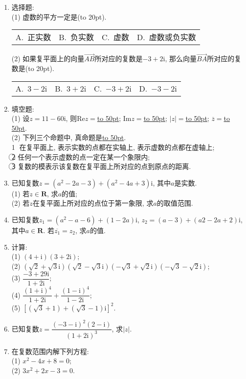 \documentclass[10pt,a4paper]{article}
\newcommand{\blank}[1]{\underline{\hbox to #1pt{}}}
\newcommand{\bracket}[1]{(\hbox to #1pt{})}
\newcommand{\fourch}[4]{\par\begin{tabular}{p{.23\textwidth}p{.23\textwidth}p{.23\textwidth}p{.23\textwidth}}
A.~#1 &B.~#2& C.~#3& D.~#4
\end{tabular}}
\begin{document}
\begin{enumerate}[1.]

\item 选择题:\\
(1) 虚数的平方一定是\bracket{20}.
\fourch{正实数}{负实数}{虚数}{虚数或负实数}
(2) 如果复平面上的向量$\overrightarrow{AB}$所对应的复数是$-3+2\mathrm{i}$, 那么向量$\overrightarrow{BA}$所对应的复数是\bracket{20}.
\fourch{$3-2\mathrm{i}$}{$3+2\mathrm{i}$}{$-3+2\mathrm{i}$}{$-3-2\mathrm{i}$}
\vspace*{3cm}
\item 填空题:\\
(1) 设$z=11-60\mathrm{i}$, 则$\mathrm{Re}z=$\blank{50}; $\mathrm{Im}z=$\blank{50}; $|z|=$\blank{50}; $\overline{z}=$\blank{50}.\\
(2) 下列三个命题中, 真命题是\blank{50}.\\
\textcircled{1} 在复平面上, 表示实数的点都在实轴上, 表示虚数的点都在虚轴上;\\
\textcircled{2} 任何一个表示虚数的点一定在某一个象限内;\\
\textcircled{3} 复数的模表示该复数在复平面上所对应的点到原点的距离.
\vspace*{3cm}
\item 已知复数$z=(a^2-2a-3)+(a^2-4a+3)\mathrm{i}$, 其中$a$是实数.\\
(1) 若$z\in \mathbf{R}$, 求$a$的值;\\
(2) 若$z$在复平面上所对应的点位于第一象限, 求$a$的取值范围.
\vspace*{3cm}
\item 已知复数$z_1=(a^2-a-6)+(1-2a)\mathrm{i}$, $z_2=(a-3)+(a2-2a+2)\mathrm{i}$, 其中$a\in \mathbf{R}$.
若$\overline{z_1}=z_2$, 求$a$的值.
\vspace*{3cm}
\item 计算:\\
(1) $(4+\mathrm{i})(3+2\mathrm{i})$;\\
(2) $(\sqrt 2+\sqrt 3\mathrm{i})(\sqrt 2-\sqrt 3\mathrm{i})(-\sqrt 3+\sqrt 2\mathrm{i})(-\sqrt 3-\sqrt 2\mathrm{i})$;\\
(3) $\dfrac{-3+29\mathrm{i}}{1+2\mathrm{i}}$;\\
(4) $\dfrac{(1+\mathrm{i})^4}{1+2\mathrm{i}}+\dfrac{(1-\mathrm{i})^4}{1-2\mathrm{i}}$;\\
(5) $[(\sqrt 3+1)+(\sqrt 3-1)\mathrm{i}]^2$.
\vspace*{3cm}
\item 已知复数$z=\dfrac{(-3-\mathrm{\mathrm{i}})^2(2-\mathrm{\mathrm{i}})}{(1+2\mathrm{i})^3}$, 求$|z|$.
\vspace*{3cm}
\item 在复数范围内解下列方程:\\
(1) $x^2-4x+8=0$;\\
(2) $3x^2+2x-3=0$.
\vspace*{3cm}
\end{enumerate}
\end{document}
